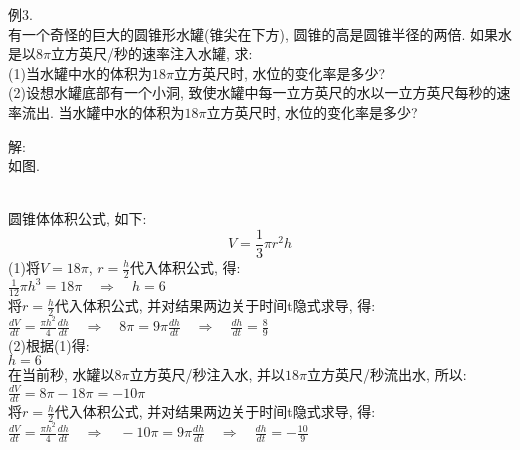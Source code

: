 \documentclass[UTF8, fontset=ubuntu, fleqn]{ctexart}
\begin{document}
例3.\\
有一个奇怪的巨大的圆锥形水罐(锥尖在下方), 圆锥的高是圆锥半径的两倍. 如果水是以$8\pi$立方英尺/秒的速率注入水罐, 求:\\
(1)当水罐中水的体积为$18\pi$立方英尺时, 水位的变化率是多少?\\
(2)设想水罐底部有一个小洞, 致使水罐中每一立方英尺的水以一立方英尺每秒的速率流出. 当水罐中水的体积为$18\pi$立方英尺时, 水位的变化率是多少?

解:\\
如图.\\
\\
圆锥体体积公式, 如下:
\[V=\frac{1}{3}\pi r^2h\]
(1)将$V=18\pi$, $r=\frac{h}{2}$代入体积公式, 得:\\[1ex]
\phantom{(1)}$\displaystyle\frac{1}{12}\pi h^3=18\pi\quad\Rightarrow\quad h=6$\\[1ex]
\phantom{(1)}将$r=\frac{h}{2}$代入体积公式, 并对结果两边关于时间t隐式求导, 得:\\[1ex]
\phantom{(1)}$\displaystyle\frac{dV}{dt}=\frac{\pi h^2}{4}\frac{dh}{dt}\quad\Rightarrow\quad 8\pi=9\pi\frac{dh}{dt}\quad\Rightarrow\quad\frac{dh}{dt}=\frac{8}{9}$\\[1ex]
(2)根据(1)得:\\
\phantom{(2)}$h=6$\\
\phantom{(2)}在当前秒, 水罐以$8\pi$立方英尺/秒注入水, 并以$18\pi$立方英尺/秒流出水, 所以:\\[1ex]
\phantom{(2)}$\displaystyle\frac{dV}{dt}=8\pi-18\pi=-10\pi$\\[1ex]
\phantom{(2)}将$r=\frac{h}{2}$代入体积公式, 并对结果两边关于时间t隐式求导, 得:\\[1ex]
\phantom{(2)}$\displaystyle\frac{dV}{dt}=\frac{\pi h^2}{4}\frac{dh}{dt}\quad\Rightarrow\quad -10\pi=9\pi\frac{dh}{dt}\quad\Rightarrow\quad\frac{dh}{dt}=-\frac{10}{9}$\\[2ex]
\end{document}

